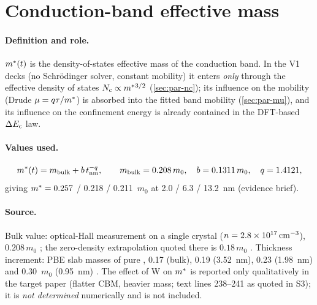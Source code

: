 \section{Conduction-band effective mass}
\label{sec:par-mstar}

\paragraph{Definition and role.}
$m^{*}(t)$ is the density-of-states effective mass of the conduction band. In the V1 decks (no
Schr\"odinger solver, constant mobility) it enters \emph{only} through the effective density of states
$N_{\mathrm{c}} \propto m^{*}{}^{3/2}$ (\cref{sec:par-nc}); its influence on the mobility (Drude $\mu = q\tau/m^{*}$) is absorbed
into the fitted band mobility (\cref{sec:par-mu}), and its influence on the confinement energy is already
contained in the DFT-based $\Delta E_{\mathrm{c}}$ law.

\paragraph{Values used.}
\begin{equation}
  m^{*}(t) = m_{\mathrm{bulk}} + b\,t_{\mathrm{nm}}^{-q},\qquad m_{\mathrm{bulk}} = 0.208\,m_0,\quad
  b = 0.1311\,m_0,\quad q = 1.4121,
  \label{eq:d1-mstar}
\end{equation}
giving $m^{*} = 0.257$ / 0.218 / 0.211~$m_0$ at 2.0 / 6.3 / 13.2~nm (evidence brief).

\paragraph{Source.}
Bulk value: optical-Hall measurement on a single \InO{} crystal ($n = 2.8\times10^{17}\,\mathrm{cm}^{-3}$),
$0.208\,m_0$ \citep[p.~225102-1, abstract]{Stokey2021}; the zero-density extrapolation quoted there is $0.18\,m_0$
\citep[p.~225102-2]{Stokey2021}. Thickness increment: PBE slab masses of pure \InO{}, 0.17 (bulk), 0.19
(3.52~nm), 0.23 (1.98~nm) and 0.30~$m_0$ (0.95~nm) \citep[p.~21540]{Lin2022}. The effect of W on $m^{*}$ is
reported only qualitatively in the target paper (flatter CBM, heavier mass; text lines 238--241 as quoted in S3);
it is \emph{not determined} numerically and is not included.

